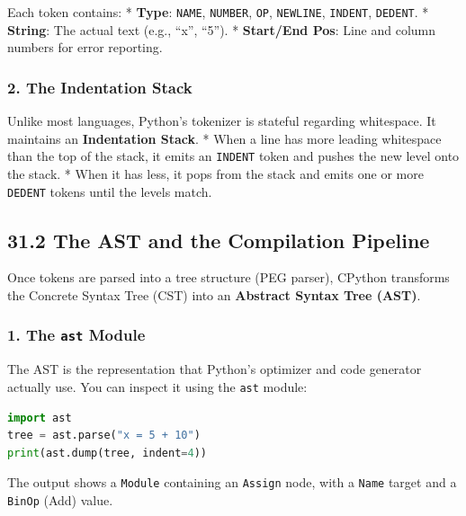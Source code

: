 Each token contains: * \textbf{Type}: \passthrough{\lstinline!NAME!},
\passthrough{\lstinline!NUMBER!}, \passthrough{\lstinline!OP!},
\passthrough{\lstinline!NEWLINE!}, \passthrough{\lstinline!INDENT!},
\passthrough{\lstinline!DEDENT!}. * \textbf{String}: The actual text
(e.g., ``x'', ``5''). * \textbf{Start/End Pos}: Line and column numbers
for error reporting.

\hypertarget{the-indentation-stack}{%
\subsubsection{2. The Indentation Stack}\label{the-indentation-stack}}

Unlike most languages, Python's tokenizer is stateful regarding
whitespace. It maintains an \textbf{Indentation Stack}. * When a line
has more leading whitespace than the top of the stack, it emits an
\passthrough{\lstinline!INDENT!} token and pushes the new level onto the
stack. * When it has less, it pops from the stack and emits one or more
\passthrough{\lstinline!DEDENT!} tokens until the levels match.

\hypertarget{the-ast-and-the-compilation-pipeline}{%
\subsection{31.2 The AST and the Compilation
Pipeline}\label{the-ast-and-the-compilation-pipeline}}

Once tokens are parsed into a tree structure (PEG parser), CPython
transforms the Concrete Syntax Tree (CST) into an \textbf{Abstract
Syntax Tree (AST)}.

\hypertarget{the-ast-module}{%
\subsubsection{\texorpdfstring{1. The \texttt{ast}
Module}{1. The ast Module}}\label{the-ast-module}}

The AST is the representation that Python's optimizer and code generator
actually use. You can inspect it using the \passthrough{\lstinline!ast!}
module:

\begin{lstlisting}[language=Python]
import ast
tree = ast.parse("x = 5 + 10")
print(ast.dump(tree, indent=4))
\end{lstlisting}

The output shows a \passthrough{\lstinline!Module!} containing an
\passthrough{\lstinline!Assign!} node, with a
\passthrough{\lstinline!Name!} target and a
\passthrough{\lstinline!BinOp!} (Add) value.

